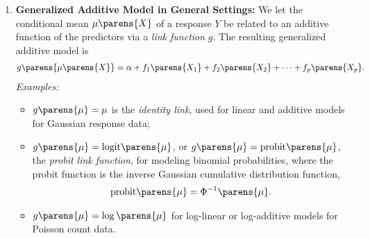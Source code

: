 \documentclass[12pt]{article}
\begin{document}
\begin{enumerate}[label=\textbf{\arabic*.}]
	\item \textbf{Generalized Additive Model in General Settings:} We let the conditional mean $\mu \parens{X}$ of a response $Y$ be related to an additive function of the predictors via a \textit{link function} $g$. The resulting generalized additive model is 
	\begin{align*}
		g \parens{\mu \parens{X}} = \alpha + f_1 \parens{X_1} + f_2 \parens{X_2} + \cdots + f_p \parens{X_p}. 
	\end{align*}
	\textit{Examples:}
	\begin{itemize}
		\item $g \parens{\mu} = \mu$ is the \emph{identity link}, used for linear and additive models for Gaussian response data; 
		\item $g \parens{\mu} = \mathrm{logit} \parens{\mu}$, or $g \parens{\mu} = \mathrm{probit} \parens{\mu}$, the \emph{probit link function}, for modeling binomial probabilities, where the probit function is the inverse Gaussian cumulative distribution function, 
		\begin{align}
			\mathrm{probit} \parens{\mu} = \Phi^{-1} \parens{\mu}. 
		\end{align}
		\item $g \parens{\mu} = \log \parens{\mu}$ for log-linear or log-additive models for Poisson count data. 
	\end{itemize}
	

\end{enumerate}
\end{document}

